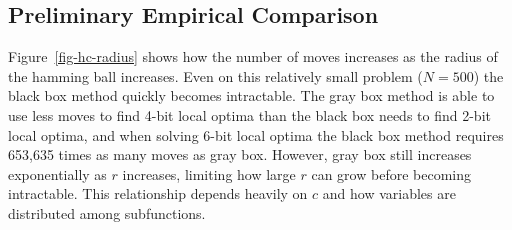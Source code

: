 \subsection{Preliminary Empirical Comparison}
Figure~\ref{fig-hc-radius} shows how the number of moves increases as the radius of the hamming ball increases.
Even on this relatively small problem ($N=500$) the black box method quickly becomes intractable. The gray box
method is able to use less moves to find 4-bit local optima than the black box needs to find 2-bit local optima,
and when solving 6-bit local optima the black box method requires 653,635 times as many moves as gray box. However,
gray box still increases exponentially as $r$ increases, limiting how large $r$ can grow before becoming intractable.
This relationship depends heavily on $c$ and how variables are distributed among subfunctions.

\begin{comment}
\section{Memetic Algorithms}
~\cite{chen:2011:memetic}


Local search, even $r$-bit hamming ball search, is not sufficient to robustly find global optimums on
highly multi-modal problems. This limitation was shown in Figure~\ref{fig-evals-to-success} with hill climbing
unable to reach the global optima on almost any large size problem.
\end{comment}
